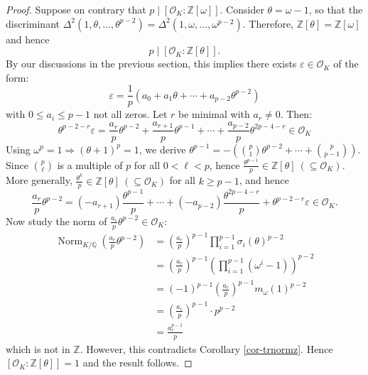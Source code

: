 \begin{proof}
\medskip
Suppose on contrary that $p \mid [\mathcal{O}_K: \mathbb{Z}[\omega]]$. Consider $\theta = \omega - 1$, so that the discriminant $\Delta^2(1,\theta,\dots,\theta^{p-2}) = \Delta^2(1,\omega,\dots,\omega^{p-2})$. Therefore, $\mathbb{Z}[\theta]=\mathbb{Z}[\omega]$ and hence 
$$p \mid [\mathcal{O}_K: \mathbb{Z}[\theta]].$$
By our discussions in the previous section, this implies there exists $\varepsilon \in \mathcal{O}_K$ of the form:
$$
\varepsilon = \frac{1}{p}(a_0 + a_1\theta + \cdots + a_{p-2}\theta^{p-2})
$$
with $0 \leq a_i \leq p-1$ not all zeros. Let $r$ be minimal with $a_r \neq 0$. Then:
$$
\theta^{p-2-r}\varepsilon = \frac{a_r}{p}\theta^{p-2} + \frac{a_{r+1}}{p}\theta^{p-1} + \cdots + \frac{a_{p-2}}{p}\theta^{2p-4-r} \in \mathcal{O}_K
$$
Using $\omega^p = 1 \Rightarrow (\theta+1)^p = 1$, we derive
$
\theta^{p-1} = -\left(\binom{p}{1}\theta^{p-2} + \cdots + \binom{p}{p-1}\right)
$. Since $\binom{p}{\ell}$ is a multiple of $p$ for all $0 < \ell < p$, hence $\frac{\theta^{p-1}}{p} \in \mathbb{Z}[\theta] \ (\subseteq \mathcal{O}_K)$. More generally, $\frac{\theta^k}{p} \in \mathbb{Z}[\theta]  \ (\subseteq \mathcal{O}_K)$ for all $k \geq p-1$, and hence 
$$\frac{a_r}{p}\theta^{p-2}  = (-a_{r+1})\frac{\theta^{p-1}}{p} + \cdots + (-a_{p-2})\frac{\theta^{2p-4-r}}{p}+\theta^{p-2-r}\varepsilon \in \mathcal{O}_K.
$$
Now study the norm of $\frac{a_r}{p}\theta^{p-2} \in \mathcal{O}_K$:
\begin{align*}
\operatorname{Norm}_{K/\mathbb{Q}}\left(\frac{a_r}{p}\theta^{p-2}\right) &= \left(\frac{a_r}{p}\right)^{p-1} \prod_{i=1}^{p-1} \sigma_i(\theta)^{p-2} \\
&= \left(\frac{a_r}{p}\right)^{p-1} \left(\prod_{i=1}^{p-1} (\omega^i-1)\right)^{p-2} \\
&= (-1)^{p-1}\left(\frac{a_r}{p}\right)^{p-1} m_{\omega}(1)^{p-2} \\
&= \left(\frac{a_r}{p}\right)^{p-1} \cdot p^{p-2} \\
&= \frac{a_r^{p-1}}{p}
\end{align*}
which is not in $\mathbb{Z}$. However, this contradicts Corollary \ref{cor-trnormz}. Hence $[\mathcal{O}_K : \mathbb{Z}[\theta]] = 1$ and the result follows.
\end{proof}
